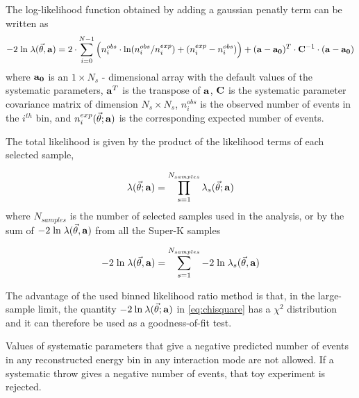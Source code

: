 The log-likelihood function obtained by adding a gaussian penatly term can be written as
\begin{equation} \label{eq:chisquare_penalty}
-2 \; \textrm{ln} \; \lambda (\vec{\theta},{\bf a}) = 2 \cdot \sum_{i=0}^{N-1} 
   \Big( 
     n^{obs}_{i} \cdot \textrm{ln} (n^{obs}_{i}/n^{exp}_{i}) +
     (n^{exp}_{i}-n^{obs}_{i}) 
   \Big) +
   ({\bf a}-{\bf a_{0}})^{T} \cdot {\bf C}^{-1} \cdot ({\bf a}-{\bf a_{0}})
\end{equation}
where
${\bf a_{0}}$ is an $1 \times N_{s}$ - dimensional array with the default values of 
the systematic parameters, ${\bf a}^{T}$ is the transpose of ${\bf a}$,
${\bf C}$ is the systematic parameter covariance matrix of dimension $N_{s} \times N_{s}$,
$n^{obs}_{i}$ is the observed number of events in the $i^{th}$ bin, and
$n^{exp}_{i}(\vec{\theta}; {\bf a})$ 
is the corresponding expected number of events.

The total likelihood is given by the product of the likelihood terms of each selected sample,

\begin{equation} \label{eq:totlike}
\lambda(\vec{\theta}; {\bf a}) = \prod_{s=1}^{N_{samples}} \lambda_s (\vec{\theta}; {\bf a})
\end{equation}
where $N_{samples}$ is the number of selected samples used in the analysis, or
by the sum of $-2 \; \textrm{ln} \; \lambda (\vec{\theta},{\bf a})$ from all the Super-K samples

\begin{equation} \label{eq:totlike_2}
-2 \; \textrm{ln} \; \lambda (\vec{\theta},{\bf a}) = \sum_{s=1}^{N_{samples}} -2 \; \textrm{ln} \; \lambda_s (\vec{\theta},{\bf a})
\end{equation}

The advantage of the used binned likelihood ratio method is that,
in the large-sample limit, the quantity 
$-2 \: \textrm{ln} \: \lambda (\vec{\theta}; {\bf a})$
in \cref{eq:chisquare} has a $\chi^{2}$ distribution and it can therefore be used as a goodness-of-fit test.

Values of systematic parameters that give a negative predicted number of events in any reconstructed energy bin in any interaction 
mode are not allowed. If a systematic throw gives a negative number of events, that toy experiment is rejected.

